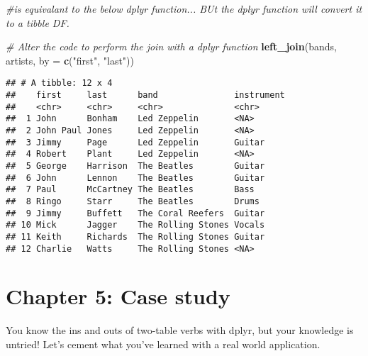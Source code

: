 \documentclass[]{article}
\newenvironment{Shaded}{\begin{snugshade}}{\end{snugshade}}
\newcommand{\KeywordTok}[1]{\textcolor[rgb]{0.13,0.29,0.53}{\textbf{#1}}}
\newcommand{\DataTypeTok}[1]{\textcolor[rgb]{0.13,0.29,0.53}{#1}}
\newcommand{\StringTok}[1]{\textcolor[rgb]{0.31,0.60,0.02}{#1}}
\newcommand{\CommentTok}[1]{\textcolor[rgb]{0.56,0.35,0.01}{\textit{#1}}}
\newcommand{\NormalTok}[1]{#1}
\begin{document}
\begin{Shaded}
\begin{Highlighting}[]
\CommentTok{#is equivalant to the below dplyr function... BUt the dplyr function will convert it to a tibble DF.}

\CommentTok{# Alter the code to perform the join with a dplyr function}
\KeywordTok{left_join}\NormalTok{(bands, artists, }\DataTypeTok{by =} \KeywordTok{c}\NormalTok{(}\StringTok{"first"}\NormalTok{, }\StringTok{"last"}\NormalTok{))}
\end{Highlighting}
\end{Shaded}

\begin{verbatim}
## # A tibble: 12 x 4
##    first     last      band               instrument
##    <chr>     <chr>     <chr>              <chr>     
##  1 John      Bonham    Led Zeppelin       <NA>      
##  2 John Paul Jones     Led Zeppelin       <NA>      
##  3 Jimmy     Page      Led Zeppelin       Guitar    
##  4 Robert    Plant     Led Zeppelin       <NA>      
##  5 George    Harrison  The Beatles        Guitar    
##  6 John      Lennon    The Beatles        Guitar    
##  7 Paul      McCartney The Beatles        Bass      
##  8 Ringo     Starr     The Beatles        Drums     
##  9 Jimmy     Buffett   The Coral Reefers  Guitar    
## 10 Mick      Jagger    The Rolling Stones Vocals    
## 11 Keith     Richards  The Rolling Stones Guitar    
## 12 Charlie   Watts     The Rolling Stones <NA>
\end{verbatim}

\section{Chapter 5: Case study}\label{chapter-5-case-study}

You know the ins and outs of two-table verbs with dplyr, but your
knowledge is untried! Let's cement what you've learned with a real world
application.
\end{document}
